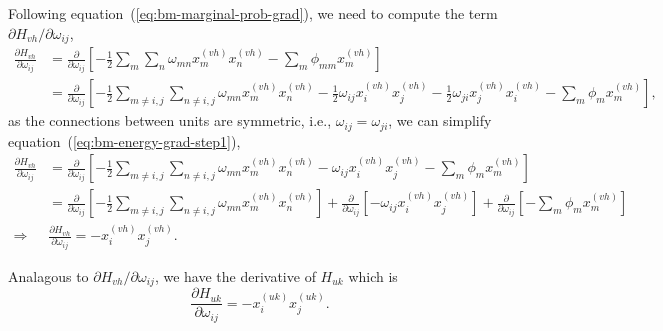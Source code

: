 Following equation~(\ref{eq:bm-marginal-prob-grad}), we need to compute the term $\partial H_{vh}/\partial \omega_{ij}$,
\begin{equation}
  \label{eq:bm-energy-grad-step1}
  \begin{split}
      \frac{\partial H_{vh}}{\partial \omega_{ij}} & = \frac{\partial}{\partial \omega_{ij}} \left[- \frac{1}{2} \sum_{m} \sum_{n} \omega_{mn} x^{(vh)}_{m} x^{(vh)}_{n} - \sum_{m} \phi_{mm} x^{(vh)}_{m} \right] \\
                                                   & = \frac{\partial}{\partial \omega_{ij}} \left[- \frac{1}{2} \sum_{m \neq i,j} \sum_{n \neq i,j} \omega_{mn} x^{(vh)}_{m} x^{(vh)}_{n} - \frac{1}{2} \omega_{ij} x^{(vh)}_{i} x^{(vh)}_{j} - \frac{1}{2} \omega_{ji} x^{(vh)}_{j} x^{(vh)}_{i} - \sum_{m} \phi_{m} x^{(vh)}_{m} \right],
  \end{split}
\end{equation}
as the connections between units are symmetric, i.e., $\omega_{ij} = \omega_{ji}$, we can simplify equation~(\ref{eq:bm-energy-grad-step1}),
\begin{equation}
  \label{eq:bm-energy-grad-final}
  \begin{split}
    \frac{\partial H_{vh}}{\partial \omega_{ij}} & = \frac{\partial}{\partial \omega_{ij}} \left[- \frac{1}{2} \sum_{m \neq i,j} \sum_{n \neq i,j} \omega_{mn} x^{(vh)}_{m} x^{(vh)}_{n} - \omega_{ij} x^{(vh)}_{i} x^{(vh)}_{j} - \sum_{m} \phi_{m} x^{(vh)}_{m} \right] \\
    & = \frac{\partial}{\partial \omega_{ij}} \left[- \frac{1}{2} \sum_{m \neq i,j} \sum_{n \neq i,j} \omega_{mn} x^{(vh)}_{m} x^{(vh)}_{n} \right] + \frac{\partial}{\partial \omega_{ij}} \left[- \omega_{ij} x^{(vh)}_{i} x^{(vh)}_{j} \right] + \frac{\partial}{\partial \omega_{ij}} \left[- \sum_{m} \phi_{m} x^{(vh)}_{m} \right] \\
    \Rightarrow & \frac{\partial H_{vh}}{\partial \omega_{ij}} = - x^{(vh)}_{i} x^{(vh)}_{j}.
  \end{split}
\end{equation}

Analagous to $\partial H_{vh}/\partial \omega_{ij}$, we have the derivative of $H_{uk}$ which is
\begin{equation}
  \label{eq:bm-energy-grad-final2}
  \frac{\partial H_{uk}}{\partial \omega_{ij}} = - x^{(uk)}_{i} x^{(uk)}_{j}.
\end{equation}

